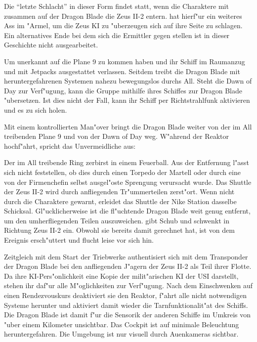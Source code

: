 
Die ``letzte Schlacht'' in dieser Form findet statt, wenn die Charaktere mit \xl{} zusammen auf der Dragon Blade die Zeus II-2 entern. \xl{} hat hierf"ur ein weiteres Ass im "Armel, um die Zeus KI zu "uberzeugen sich auf ihre Seite zu schlagen. Ein alternatives Ende bei dem sich die Ermittler gegen \xl{} stellen ist in dieser Geschichte nicht ausgearbeitet.

Um unerkannt auf die Plane 9 zu kommen haben \xl{} und \ml{} ihr Schiff im Raumanzug und mit Jetpacks ausgestattet verlassen. Seitdem treibt die Dragon Blade mit heruntergefahrenen Systemen nahezu bewegungslos durchs All. Steht die Dawn of Day zur Verf"ugung, kann die Gruppe mithilfe ihres Schiffes zur Dragon Blade "ubersetzen. Ist dies nicht der Fall, kann \xl{} ihr Schiff per Richtstrahlfunk aktivieren und es zu sich holen.

Mit einem kontrollierten Man"over bringt \xl{} die Dragon Blade weiter von der im All treibenden Plane 9 und von der Dawn of Day weg. W"ahrend der Reaktor hochf"ahrt, spricht \xl{} das Unvermeidliche aus:


Der im All treibende Ring zerbirst in einem Feuerball. Aus der Entfernung l"asst sich nicht feststellen, ob dies durch einen Torpedo der Martell oder durch eine von der Firmenchefin selbst ausgel"oste Sprengung verursacht wurde. Das Shuttle der Zeus II-2 wird durch anfliegenden Tr"ummerteilen zerst"ort. Wenn nicht durch die Charaktere gewarnt, erleidet das Shuttle der Nike Station dasselbe Schicksal. Gl"ucklicherweise ist die fl"uchtende Dragon Blade weit genug entfernt, um den umherfliegenden Teilen auszuweichen. \xl{} gibt Schub und schwenkt in Richtung Zeus II-2 ein. Obwohl sie bereits damit gerechnet hat, ist \ml{} von dem Ereignis ersch"uttert und flucht leise vor sich hin.

Zeitgleich mit dem Start der Triebwerke authentisiert sich \xl{} mit dem Transponder der Dragon Blade bei den anfliegenden J"agern der Zeus II-2 als Teil ihrer Flotte. Da ihre KI-Pers"onlichkeit eine Kopie der milit"arischen KI der USI darstellt, stehen ihr daf"ur alle M"oglichkeiten zur Verf"ugung. Nach dem Einschwenken auf einen Rendezvouskurs deaktiviert sie den Reaktor, f"ahrt alle nicht notwendigen Systeme herunter und aktiviert damit wieder die Tarnfunktionalit"at des Schiffs. Die Dragon Blade ist damit f"ur die Sensorik der anderen Schiffe im Umkreis von "uber einem Kilometer unsichtbar. Das Cockpit ist auf minimale Beleuchtung heruntergefahren. Die Umgebung ist nur visuell durch Au\3enkameras sichtbar.


